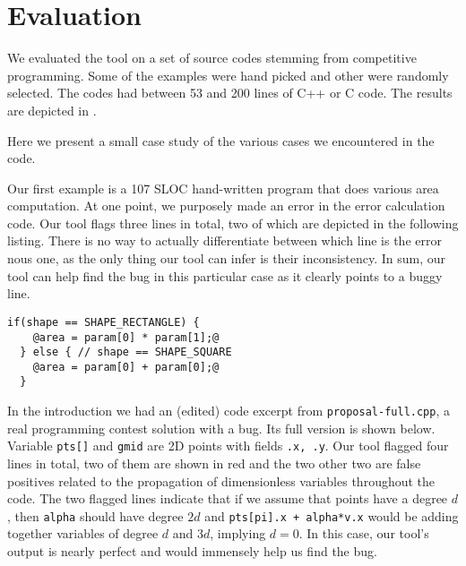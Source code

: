 \documentclass[12pt]{article}
\begin{document}
\section{Evaluation}

We evaluated the tool on a set of source codes stemming from competitive programming.
Some of the examples were hand picked and other were randomly selected.
The codes had between 53 and 200 lines of C++ or C code.
The results are depicted in .

\begin{table}[H]
  \caption{Evaluation results}
  \label{table:eval-results}
\end{table}

Here we present a small case study of the various cases we encountered in the code.

Our first example is a 107 SLOC hand-written program that does various area computation.
At one point, we purposely made an error in the error calculation code.
Our tool flags three lines in total, two of which are depicted in the following listing.
There is no way to actually differentiate between which line is the error nous one, as the
only thing our tool can infer is their inconsistency.
In sum, our tool can help find the bug in this
particular case as it clearly points to a buggy line.

\begin{lstlisting}[label=quadrilateral.c]
  if(shape == SHAPE_RECTANGLE) {
    @area = param[0] * param[1];@
  } else { // shape == SHAPE_SQUARE
    @area = param[0] + param[0];@
  }
\end{lstlisting}

In the introduction we had an (edited) code excerpt from \texttt{proposal-full.cpp},
a real programming contest solution with a bug.
Its full version is shown below.
Variable \texttt{pts[]} and \texttt{gmid} are 2D points with fields \texttt{.x, .y}.
Our tool flagged four lines in total, two of them are shown in red and the two other
two are false positives related to the propagation of dimensionless variables throughout the code.
The two flagged lines indicate that if we assume that points have a degree $d$,
then \texttt{alpha} should have degree $2d$ and \texttt{pts[pi].x + alpha*v.x} would
be adding together variables of degree $d$ and $3d$, implying $d = 0$.
In this case, our tool's output is nearly perfect and would immensely help us find the bug.
\end{document}
